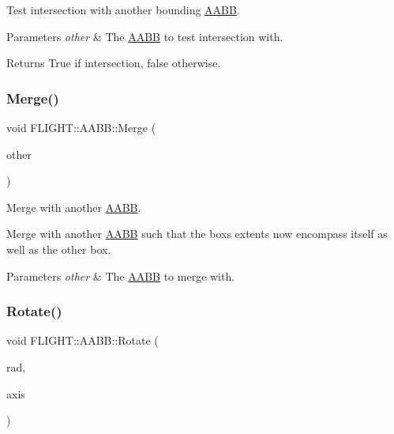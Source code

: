 Test intersection with another bounding \hyperlink{class_f_l_i_g_h_t_1_1_a_a_b_b}{A\+A\+BB}. 


\begin{DoxyParams}{Parameters}
{\em other} & The \hyperlink{class_f_l_i_g_h_t_1_1_a_a_b_b}{A\+A\+BB} to test intersection with. \\
\hline
\end{DoxyParams}
\begin{DoxyReturn}{Returns}
True if intersection, false otherwise. 
\end{DoxyReturn}
\mbox{\label{class_f_l_i_g_h_t_1_1_a_a_b_b_abd48eeb4249c76e3e2f14ed89e619031}} 
\subsubsection{\texorpdfstring{Merge()}{Merge()}}
{\footnotesize\ttfamily void F\+L\+I\+G\+H\+T\+::\+A\+A\+B\+B\+::\+Merge (\begin{DoxyParamCaption}\item[{const \hyperlink{class_f_l_i_g_h_t_1_1_a_a_b_b}{A\+A\+BB} \&}]{other }\end{DoxyParamCaption})}



Merge with another \hyperlink{class_f_l_i_g_h_t_1_1_a_a_b_b}{A\+A\+BB}. 

Merge with another \hyperlink{class_f_l_i_g_h_t_1_1_a_a_b_b}{A\+A\+BB} such that the box\textquotesingle{}s extents now encompass itself as well as the other box. 
\begin{DoxyParams}{Parameters}
{\em other} & The \hyperlink{class_f_l_i_g_h_t_1_1_a_a_b_b}{A\+A\+BB} to merge with. \\
\hline
\end{DoxyParams}
\mbox{\label{class_f_l_i_g_h_t_1_1_a_a_b_b_a3aac36f7814c77e64f8f34945c9b3442}} 
\subsubsection{\texorpdfstring{Rotate()}{Rotate()}}
{\footnotesize\ttfamily void F\+L\+I\+G\+H\+T\+::\+A\+A\+B\+B\+::\+Rotate (\begin{DoxyParamCaption}\item[{const float}]{rad,  }\item[{const glm\+::vec3 \&}]{axis }\end{DoxyParamCaption})}




